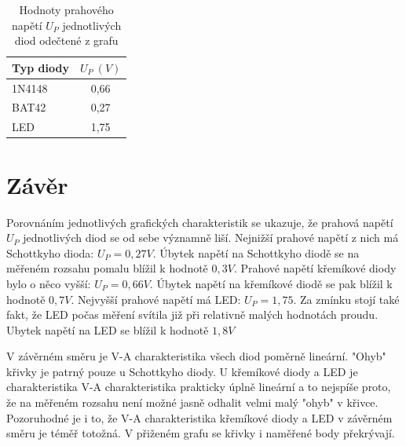 \documentclass[a4paper, czech]{article}
\begin{document}
\begin{table}[H]
  \centering
  \begin{tabular}{lc}
  \toprule
  Typ diody  & $U_P\ (V)$ \\
  \midrule
  1N4148 & 0,66     \\
  BAT42  & 0,27     \\
  LED    & 1,75    \\
  \bottomrule
  \end{tabular}
  \caption{Hodnoty prahového napětí $U_P$ jednotlivých diod odečtené z grafu}
\end{table}

\section[short]{Závěr}

Porovnáním jednotlivých grafických charakteristik se ukazuje, že prahová napětí $U_P$ jednotlivých diod se od sebe významně liší.
Nejnižší prahové napětí z nich má Schottkyho dioda: $U_P = 0,27V$.
Úbytek napětí na Schottkyho diodě se na měřeném rozsahu pomalu blížil k hodnotě $0,3V$.
Prahové napětí křemíkové diody bylo o něco vyšší: $U_P = 0,66V$.
Úbytek napětí na křemíkové diodě se pak blížil k hodnotě $0,7V$.
Nejvyšší prahové napětí má LED: $U_P = 1,75$. Za zmínku stojí také fakt, že LED počas měření svítila již při relativně malých hodnotách proudu.
Ubytek napětí na LED se blížil k hodnotě $1,8V$

V závěrném směru je V-A charakteristika všech diod poměrně lineární.
"Ohyb" křivky je patrný pouze u Schottkyho diody.
U křemíkové diody a LED je charakteristika V-A charakteristika prakticky úplně lineární a to nejspíše proto, že na měřeném rozsahu není možné jasně odhalit velmi malý "ohyb" v křivce.
Pozoruhodné je i to, že V-A charakteristika křemíkové diody a LED v závěrném směru je téměř totožná.
V přiženém grafu se křivky i naměřené body překrývají.
\end{document}
